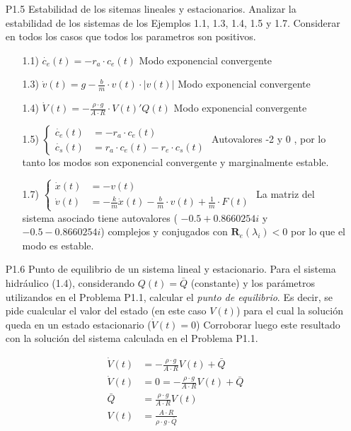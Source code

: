 \documentclass{article}
\begin{document}
\begin{itemize}
  \item[P1.5] Estabilidad de los sitemas lineales y estacionarios. Analizar la estabilidad de los sistemas de los Ejemplos 1.1, 1.3, 1.4, 1.5 y 1.7. Considerar en todos los casos que todos los parametros son positivos.

\begin{itemize}
        \item[1.1)] $ \dot{c_e}(t) = -r_a \cdot c_e(t) $ Modo exponencial convergente
        \item[1.3)] $ \dot{v}(t) = g - \frac{b}{m} \cdot v(t) \cdot \lvert v(t) \rvert $  Modo exponencial convergente
        \item[1.4)] $ \dot{V}(t) = - \frac{\rho \cdot g}{A \cdot R} \cdot V(t) 'Q(t) $  Modo exponencial convergente
        \item[1.5)] 
$
\left\{ \begin{array}{rl}
  \dot{c_e}(t) &= - r_a  \cdot c_e(t) \\
  \dot{c_s}(t) &= r_a \cdot c_e(t) - r_e \cdot c_s(t)
       \end{array} \right .
$
Autovalores -2 y 0 , por lo tanto los modos son exponencial convergente y marginalmente estable.

        \item[1.7)] 
$
\left\{ \begin{array}{rl}
  \dot{x}(t) &= - v(t) \\
  \dot{v}(t) &= - \frac{k}{m} \dot x(t) - \frac{b}{m}\cdot v(t) + \frac{1}{m} \cdot F(t)
       \end{array} \right .
$
La matriz del sistema asociado tiene autovalores ( $- 0.5 + 0.8660254i$ y $ - 0.5 - 0.8660254i $) complejos y conjugados con $\mathbf{R}_e (\lambda_{i}) < 0$ por lo que el modo es estable.
\end{itemize}

  \item[P1.6] Punto de equilibrio de un sistema lineal y estacionario. Para el sistema hidráulico (1.4), considerando $Q(t)=\bar{Q}$ (constante) y los parámetros utilizandos en el Problema P1.1, calcular el \textit{punto de equilibrio}. Es decir, se pide cualcular el valor del estado (en este caso $V(t)$) para el cual la solución queda en un estado estacionario ($\dot{V}(t)=0$)
Corroborar luego este resultado con la solución del sistema calculada en el Problema P1.1.

\begin{equation*}
\begin{array}{rl}
\dot{V}(t) &= - \frac{\rho \cdot g}{A \cdot R} V(t) + \bar{Q} \\
\dot{V}(t) &= 0 = - \frac{\rho \cdot g}{A \cdot R} V(t) + \bar{Q} \\
\bar{Q} &= \frac{\rho \cdot g}{A \cdot R} V(t) \\
 V(t) &= \frac{A \cdot R}{\rho \cdot g \cdot \bar{Q} }
\end{array} 
\end{equation*}


\end{itemize}
\end{document}
